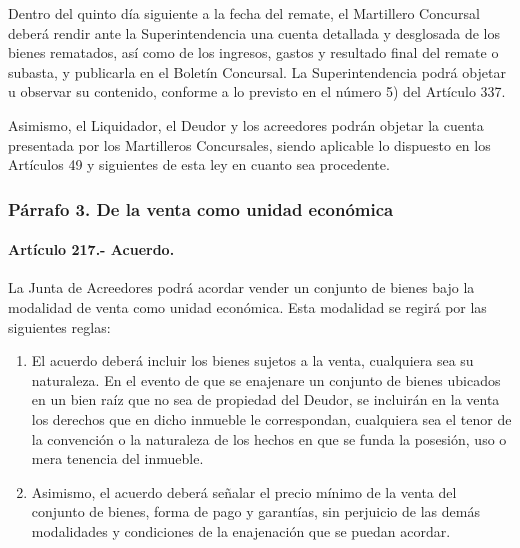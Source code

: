 \documentclass[
]{book}
\begin{document}
Dentro del quinto día siguiente a la fecha del remate, el Martillero Concursal deberá rendir ante la Superintendencia una cuenta detallada y desglosada de los bienes rematados, así como de los ingresos, gastos y resultado final del remate o subasta, y publicarla en el Boletín Concursal. La Superintendencia podrá objetar u observar su contenido, conforme a lo previsto en el número 5) del Artículo 337.

Asimismo, el Liquidador, el Deudor y los acreedores podrán objetar la cuenta presentada por los Martilleros Concursales, siendo aplicable lo dispuesto en los Artículos 49 y siguientes de esta ley en cuanto sea procedente.

\hypertarget{puxe1rrafo-3.-de-la-venta-como-unidad-econuxf3mica}{%
\subsubsection*{Párrafo 3. De la venta como unidad económica}\label{puxe1rrafo-3.-de-la-venta-como-unidad-econuxf3mica}}

\hypertarget{artuxedculo-217.--acuerdo.}{%
\paragraph*{Artículo 217.- Acuerdo.}\label{artuxedculo-217.--acuerdo.}}

La Junta de Acreedores podrá acordar vender un conjunto de bienes bajo la modalidad de venta como unidad económica. Esta modalidad se regirá por las siguientes reglas:

\begin{enumerate}
\def\labelenumi{\arabic{enumi})}
\item
  El acuerdo deberá incluir los bienes sujetos a la venta, cualquiera sea su naturaleza. En el evento de que se enajenare un conjunto de bienes ubicados en un bien raíz que no sea de propiedad del Deudor, se incluirán en la venta los derechos que en dicho inmueble le correspondan, cualquiera sea el tenor de la convención o la naturaleza de los hechos en que se funda la posesión, uso o mera tenencia del inmueble.
\item
  Asimismo, el acuerdo deberá señalar el precio mínimo de la venta del conjunto de bienes, forma de pago y garantías, sin perjuicio de las demás modalidades y condiciones de la enajenación que se puedan acordar.
\end{enumerate}
\end{document}
